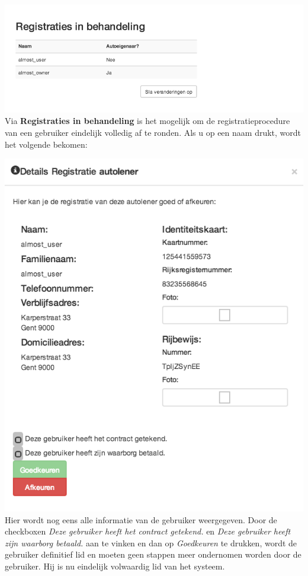 \documentclass[11pt,a4paper,oneside]{article}
\begin{document}
\includegraphics[scale=0.6]{registratiesinbehandeling} \\
Via \textbf{Registraties in behandeling} is het mogelijk om de registratieprocedure van een gebruiker eindelijk volledig af te ronden. Als u op een naam drukt, wordt het volgende bekomen:

\includegraphics[scale=0.5]{detailsregistratieautolener} \\
Hier wordt nog eens alle informatie van de gebruiker weergegeven.
Door de checkboxen \textit{Deze gebruiker heeft het contract getekend.} en \textit{Deze gebruiker heeft zijn waarborg betaald.} aan te vinken en dan op \textit{Goedkeuren} te drukken, wordt de gebruiker definitief lid en moeten geen stappen meer ondernomen worden door de gebruiker. Hij is nu eindelijk volwaardig lid van het systeem.
\end{document}
